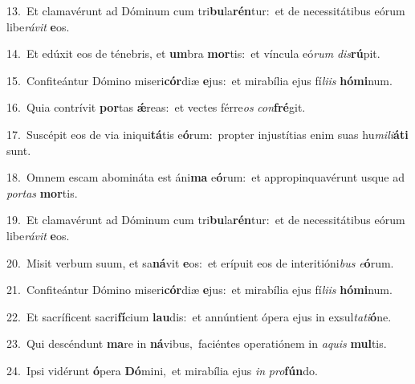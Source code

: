 {\numbfont\textcolor{\numbcolor}{13.}}~Et clamavérunt ad Dóminum cum tri\-\textbf{bu}\-la\-\textbf{rén}\-tur:~\star et de necessitátibus eórum libe\-\textit{rá}\-\textit{vit} \textbf{e}\-os.\par
{\numbfont\textcolor{\numbcolor}{14.}}~Et edúxit eos de ténebris, et \textbf{um}\-bra \textbf{mor}\-tis:~\star et víncula eó\textit{rum} \textit{dis}\-\textbf{rú}pit.\par
{\numbfont\textcolor{\numbcolor}{15.}}~Confiteántur Dómino miseri\-\textbf{cór}\-diæ \textbf{e}\-jus:~\star et mirabília ejus fí\-\textit{li}\-\textit{is} \textbf{hó}\-\textbf{mi}num.\par
{\numbfont\textcolor{\numbcolor}{16.}}~Quia contrívit \textbf{por}\-tas \textbf{ǽ}\-reas:~\star et vectes férre\textit{os} \textit{con}\-\textbf{fré}git.\par
{\numbfont\textcolor{\numbcolor}{17.}}~Suscépit eos de via iniqui\-\textbf{tá}\-tis e\-\textbf{ó}\-rum:~\star propter injustítias enim suas hu\-\textit{mi}\-\textit{li}\textbf{á}\textbf{ti} sunt.\par
{\numbfont\textcolor{\numbcolor}{18.}}~Omnem escam abomináta est áni\textbf{ma} e\-\textbf{ó}\-rum:~\star et appropinquavérunt usque ad \textit{por}\-\textit{tas} \textbf{mor}\-tis.\par
{\numbfont\textcolor{\numbcolor}{19.}}~Et clamavérunt ad Dóminum cum tri\-\textbf{bu}\-la\-\textbf{rén}\-tur:~\star et de necessitátibus eórum libe\-\textit{rá}\-\textit{vit} \textbf{e}\-os.\par
{\numbfont\textcolor{\numbcolor}{20.}}~Misit verbum suum, et sa\-\textbf{ná}\-vit \textbf{e}\-os:~\star et erípuit eos de interitióni\textit{bus} \textit{e}\-\textbf{ó}rum.\par
{\numbfont\textcolor{\numbcolor}{21.}}~Confiteántur Dómino miseri\-\textbf{cór}\-diæ \textbf{e}\-jus:~\star et mirabília ejus fí\-\textit{li}\-\textit{is} \textbf{hó}\-\textbf{mi}num.\par
{\numbfont\textcolor{\numbcolor}{22.}}~Et sacríficent sacri\-\textbf{fí}\-cium \textbf{lau}\-dis:~\star et annúntient ópera ejus in exsul\-\textit{ta}\-\textit{ti}\textbf{ó}ne.\par
{\numbfont\textcolor{\numbcolor}{23.}}~Qui descéndunt \textbf{ma}\-re in \textbf{ná}\-vibus,~\star faciéntes operatiónem in \textit{a}\-\textit{quis} \textbf{mul}\-tis.\par
{\numbfont\textcolor{\numbcolor}{24.}}~Ipsi vidérunt \textbf{ó}\-pera \textbf{Dó}\-mini,~\star et mirabília ejus \textit{in} \textit{pro}\-\textbf{fún}do.\par
